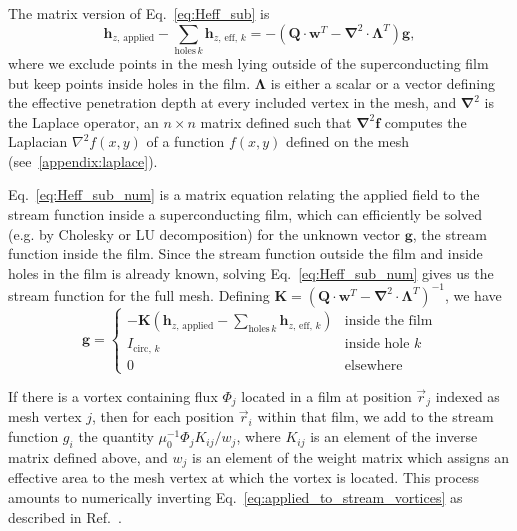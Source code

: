 \documentclass[final,3p,times,twocolumn]{elsarticle}
\newcounter{bla}
\begin{document}
The matrix version of Eq.~\ref{eq:Heff_sub} is
\begin{equation}
    \label{eq:Heff_sub_num}
     \mathbf{h}_{z,\,\mathrm{applied}} - \sum_{\mathrm{holes}\, k}\mathbf{h}_{z,\,\mathrm{eff},\,k} = -(\mathbf{Q}\cdot\mathbf{w}^T-\mathbf{\nabla}^2\cdot \mathbf{\Lambda}^T)\mathbf{g},
\end{equation}
where we exclude points in the mesh lying outside of the superconducting film but keep points
inside holes in the film. $\mathbf{\Lambda}$ is either a scalar or a vector defining the effective penetration depth at every included vertex in the mesh, and $\mathbf{\nabla}^2$
is the Laplace operator, an $n\times n$ matrix defined such that $\mathbf{\nabla}^2\mathbf{f}$ computes the Laplacian $\nabla^2f(x,y)$ of a function $f(x,y)$ defined on the mesh  (see~\ref{appendix:laplace}).

Eq.~\ref{eq:Heff_sub_num} is a matrix equation relating the applied field to the stream function
inside a superconducting film, which can efficiently be solved (e.g. by Cholesky or LU decomposition) for the unknown vector $\mathbf{g}$, the stream function inside the film. Since the stream function outside the film and inside holes in the film is already known, solving Eq.~\ref{eq:Heff_sub_num} gives us the stream function for the full mesh. Defining $\mathbf{K} = \left(\mathbf{Q}\cdot\mathbf{w}^T-\mathbf{\nabla}^2\cdot\mathbf{\Lambda}^T\right)^{-1}$, we have
\begin{equation}
    \label{eq:full_stream}
    \mathbf{g} = \begin{cases}
        -\mathbf{K}
        \left(\mathbf{h}_{z,\,\mathrm{applied}} - \sum_{\mathrm{holes}\,k}\mathbf{h}_{z,\,\mathrm{eff},\,k}\right)
            & \text{inside the film}\\
        I_{\mathrm{circ},\,k}
            & \text{inside hole }k\\
        0
            & \text{elsewhere}
    \end{cases}
\end{equation}

If there is a vortex containing flux $\Phi_j$ located in a film at position $\vec{r}_j$ indexed as mesh vertex $j$, then for each position $\vec{r}_i$ within that film, we add to the stream function $g_i$ the quantity $\mu_0^{-1}\Phi_jK_{ij} / w_{j}$, where $K_{ij}$ is an element of the inverse matrix defined above, and $w_{j}$ is an element of the weight matrix which assigns an effective area to the mesh vertex at which the vortex is located. This process amounts to numerically inverting Eq.~\ref{eq:applied_to_stream_vortices} as described in Ref.~\cite{Brandt2005-wj}.
\end{document}
